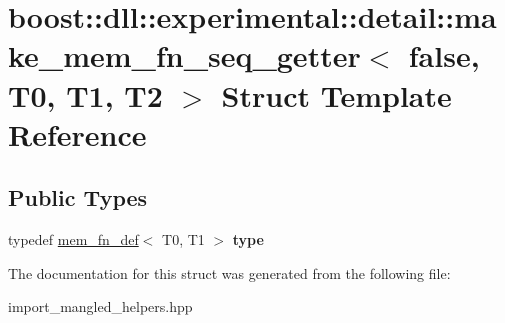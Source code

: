 \hypertarget{a00204}{}\section{boost\+:\+:dll\+:\+:experimental\+:\+:detail\+:\+:make\+\_\+mem\+\_\+fn\+\_\+seq\+\_\+getter$<$ false, T0, T1, T2 $>$ Struct Template Reference}
\label{a00204}
\subsection*{Public Types}
\begin{DoxyCompactItemize}
\item 
typedef \hyperlink{a00219}{mem\+\_\+fn\+\_\+def}$<$ T0, T1 $>$ {\bfseries type}\hypertarget{a00204_a8092888cbf07620b7979dbe8cfd96bb7}{}\label{a00204_a8092888cbf07620b7979dbe8cfd96bb7}

\end{DoxyCompactItemize}


The documentation for this struct was generated from the following file\+:\begin{DoxyCompactItemize}
\item 
import\+\_\+mangled\+\_\+helpers.\+hpp\end{DoxyCompactItemize}
